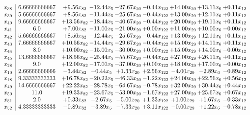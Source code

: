\documentclass[8pt]{article}
\begin{document}
\[\begin{array}{c| c c@{\hskip 2pt} c@{\hskip 2pt} c@{\hskip 2pt} c@{\hskip 2pt} c@{\hskip 2pt} c@{\hskip 2pt} c@{\hskip 2pt} }
 x_{38}   &  6.66666666667 & +  9.56 x_{82} & -12.44 x_{5} & -27.67 x_{20} & -0.44 x_{122} & + 14.00 x_{29} & + 13.11 x_{6} & +  0.11 x_{12}\\
 x_{39}   &  5.66666666667 & +  8.56 x_{82} & -11.44 x_{5} & -25.67 x_{20} & -0.44 x_{122} & + 13.00 x_{29} & + 12.11 x_{6} & +  0.11 x_{12}\\
 x_{40}   &  9.66666666667 & + 13.56 x_{82} & -18.44 x_{5} & -40.67 x_{20} & -0.44 x_{122} & + 20.00 x_{29} & + 19.11 x_{6} & +  0.11 x_{12}\\
 x_{41}   &  6.0 & +  7.00 x_{82} & -11.00 x_{5} & -21.00 x_{20} & +  0.00 x_{122} & + 11.00 x_{29} & + 10.00 x_{6} & -0.00 x_{12}\\
 x_{42}   &  5.66666666667 & +  8.56 x_{82} & -12.44 x_{5} & -25.67 x_{20} & -0.44 x_{122} & + 13.00 x_{29} & + 12.11 x_{6} & +  0.11 x_{12}\\
 x_{43}   &  7.66666666667 & + 10.56 x_{82} & -14.44 x_{5} & -29.67 x_{20} & -0.44 x_{122} & + 15.00 x_{29} & + 14.11 x_{6} & +  0.11 x_{12}\\
 x_{44}   &  8.0 & + 10.00 x_{82} & -15.00 x_{5} & -30.00 x_{20} & +  0.00 x_{122} & + 15.00 x_{29} & + 14.00 x_{6} & -0.00 x_{12}\\
 x_{45}   &  13.6666666667 & + 18.56 x_{82} & -25.44 x_{5} & -55.67 x_{20} & -0.44 x_{122} & + 27.00 x_{29} & + 26.11 x_{6} & +  0.11 x_{12}\\
 x_{28}   &  9.0 & + 12.00 x_{82} & -17.00 x_{5} & -37.00 x_{20} & +  0.00 x_{122} & + 18.00 x_{29} & + 17.00 x_{6} & -0.00 x_{12}\\
 x_{10}   &  2.66666666666 & -3.44 x_{82} & -0.44 x_{5} & +  1.33 x_{20} & +  2.56 x_{122} & -4.00 x_{29} & -2.89 x_{6} & -0.89 x_{12}\\
 x_{48}   &  9.33333333333 & + 16.78 x_{82} & -20.22 x_{5} & -46.33 x_{20} & -1.22 x_{122} & + 24.00 x_{29} & + 22.56 x_{6} & +  0.56 x_{12}\\
 x_{49}   &  14.6666666667 & + 22.22 x_{82} & -28.78 x_{5} & -64.67 x_{20} & -0.78 x_{122} & + 32.00 x_{29} & + 30.44 x_{6} & +  0.44 x_{12}\\
 x_{50}   &  11.0 & + 19.33 x_{82} & -23.67 x_{5} & -53.00 x_{20} & -1.67 x_{122} & + 27.00 x_{29} & + 25.67 x_{6} & +  0.67 x_{12}\\
 x_{51}   &  2.0 & +  0.33 x_{82} & -2.67 x_{5} & -5.00 x_{20} & +  1.33 x_{122} & +  1.00 x_{29} & +  1.67 x_{6} & -0.33 x_{12}\\
 x_{52}   &  4.33333333333 & -0.89 x_{82} & -3.89 x_{5} & -7.33 x_{20} & +  3.11 x_{122} & -0.00 x_{29} & +  1.22 x_{6} & -0.78 x_{12}\\

\end{array}\]
\end{document}
